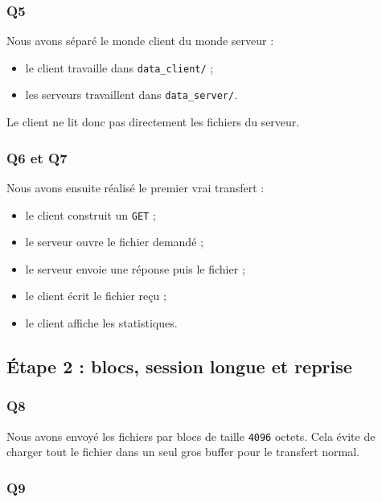 \documentclass[a4paper,11pt]{article}
\begin{document}
\subsubsection{Q5}

Nous avons séparé le monde client du monde serveur :

\begin{itemize}[leftmargin=*]
    \item le client travaille dans \texttt{data\_client/} ;
    \item les serveurs travaillent dans \texttt{data\_server/}.
\end{itemize}

Le client ne lit donc pas directement les fichiers du serveur.

\subsubsection{Q6 et Q7}

Nous avons ensuite réalisé le premier vrai transfert :

\begin{itemize}[leftmargin=*]
    \item le client construit un \texttt{GET} ;
    \item le serveur ouvre le fichier demandé ;
    \item le serveur envoie une réponse puis le fichier ;
    \item le client écrit le fichier reçu ;
    \item le client affiche les statistiques.
\end{itemize}

\subsection{Étape 2 : blocs, session longue et reprise}

\subsubsection{Q8}

Nous avons envoyé les fichiers par blocs de taille \texttt{4096} octets. Cela
évite de charger tout le fichier dans un seul gros buffer pour le transfert
normal.

\subsubsection{Q9}
\end{document}
